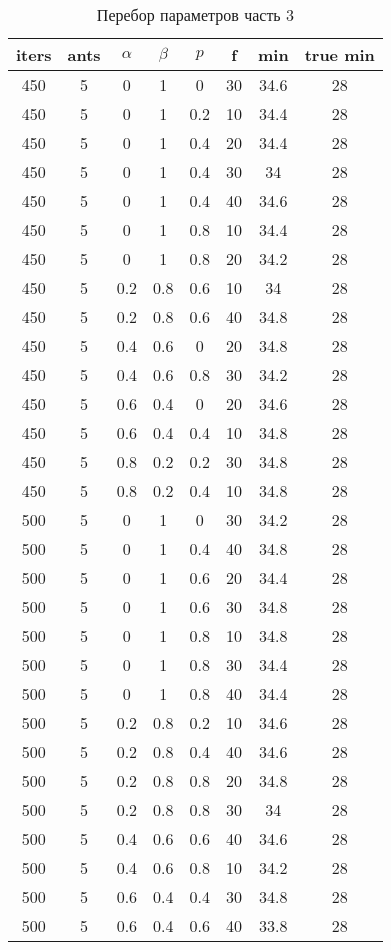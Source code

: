 \begin{table}[ph!]
  \begin{center}
    \captionsetup{justification=raggedright}
     \caption{Перебор параметров часть 3}
    \label{tab:workcost_classic}
    \begin{tabular}{c|c|c|c|c|c|c|c}
      \textbf{iters} & \textbf{ants}  & \textbf{$\alpha$}  & \textbf{$\beta$} & \textbf{$p$} & \textbf{f}  & \textbf{min}  & \textbf{true min}\\
      \hline	
	450 & 5 & 0 & 1 & 0 & 30 & 34.6 & 28\\
	450 & 5 & 0 & 1 & 0.2 & 10 & 34.4 & 28\\
	450 & 5 & 0 & 1 & 0.4 & 20 & 34.4 & 28\\
	450 & 5 & 0 & 1 & 0.4 & 30 & 34 & 28\\
	450 & 5 & 0 & 1 & 0.4 & 40 & 34.6 & 28\\
	450 & 5 & 0 & 1 & 0.8 & 10 & 34.4 & 28\\
	450 & 5 & 0 & 1 & 0.8 & 20 & 34.2 & 28\\
	450 & 5 & 0.2 & 0.8 & 0.6 & 10 & 34 & 28\\
	450 & 5 & 0.2 & 0.8 & 0.6 & 40 & 34.8 & 28\\
	450 & 5 & 0.4 & 0.6 & 0 & 20 & 34.8 & 28\\
	450 & 5 & 0.4 & 0.6 & 0.8 & 30 & 34.2 & 28\\
	450 & 5 & 0.6 & 0.4 & 0 & 20 & 34.6 & 28\\
	450 & 5 & 0.6 & 0.4 & 0.4 & 10 & 34.8 & 28\\
	450 & 5 & 0.8 & 0.2 & 0.2 & 30 & 34.8 & 28\\
	450 & 5 & 0.8 & 0.2 & 0.4 & 10 & 34.8 & 28\\
	500 & 5 & 0 & 1 & 0 & 30 & 34.2 & 28\\
	500 & 5 & 0 & 1 & 0.4 & 40 & 34.8 & 28\\
	500 & 5 & 0 & 1 & 0.6 & 20 & 34.4 & 28\\
	500 & 5 & 0 & 1 & 0.6 & 30 & 34.8 & 28\\
	500 & 5 & 0 & 1 & 0.8 & 10 & 34.8 & 28\\
	500 & 5 & 0 & 1 & 0.8 & 30 & 34.4 & 28\\
	500 & 5 & 0 & 1 & 0.8 & 40 & 34.4 & 28\\
	500 & 5 & 0.2 & 0.8 & 0.2 & 10 & 34.6 & 28\\
	500 & 5 & 0.2 & 0.8 & 0.4 & 40 & 34.6 & 28\\
	500 & 5 & 0.2 & 0.8 & 0.8 & 20 & 34.8 & 28\\
	500 & 5 & 0.2 & 0.8 & 0.8 & 30 & 34 & 28\\
	500 & 5 & 0.4 & 0.6 & 0.6 & 40 & 34.6 & 28\\
	500 & 5 & 0.4 & 0.6 & 0.8 & 10 & 34.2 & 28\\
	500 & 5 & 0.6 & 0.4 & 0.4 & 30 & 34.8 & 28\\
	500 & 5 & 0.6 & 0.4 & 0.6 & 40 & 33.8 & 28\\
    \end{tabular}
  \end{center}
\end{table}

